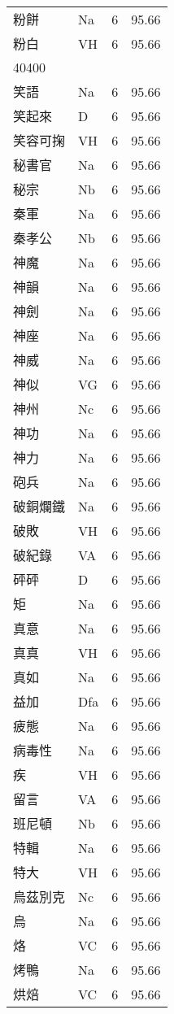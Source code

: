 \documentclass[twocolumn]{book}
\begin{document}
\begin{supertabular}{llrr}
粉餅 & Na & 6 &  95.66\\
粉白 & VH & 6 &  95.66\\
40400\\
笑語 & Na & 6 &  95.66\\
笑起來 & D & 6 &  95.66\\
笑容可掬 & VH & 6 &  95.66\\
秘書官 & Na & 6 &  95.66\\
秘宗 & Nb & 6 &  95.66\\
秦軍 & Na & 6 &  95.66\\
秦孝公 & Nb & 6 &  95.66\\
神魔 & Na & 6 &  95.66\\
神韻 & Na & 6 &  95.66\\
神劍 & Na & 6 &  95.66\\
神座 & Na & 6 &  95.66\\
神威 & Na & 6 &  95.66\\
神似 & VG & 6 &  95.66\\
神州 & Nc & 6 &  95.66\\
神功 & Na & 6 &  95.66\\
神力 & Na & 6 &  95.66\\
砲兵 & Na & 6 &  95.66\\
破銅爛鐵 & Na & 6 &  95.66\\
破敗 & VH & 6 &  95.66\\
破紀錄 & VA & 6 &  95.66\\
砰砰 & D & 6 &  95.66\\
矩 & Na & 6 &  95.66\\
真意 & Na & 6 &  95.66\\
真真 & VH & 6 &  95.66\\
真如 & Na & 6 &  95.66\\
益加 & Dfa & 6 &  95.66\\
疲態 & Na & 6 &  95.66\\
病毒性 & Na & 6 &  95.66\\
疾 & VH & 6 &  95.66\\
留言 & VA & 6 &  95.66\\
班尼頓 & Nb & 6 &  95.66\\
特輯 & Na & 6 &  95.66\\
特大 & VH & 6 &  95.66\\
烏茲別克 & Nc & 6 &  95.66\\
烏 & Na & 6 &  95.66\\
烙 & VC & 6 &  95.66\\
烤鴨 & Na & 6 &  95.66\\
烘焙 & VC & 6 &  95.66\\

\end{supertabular}
\end{document}
